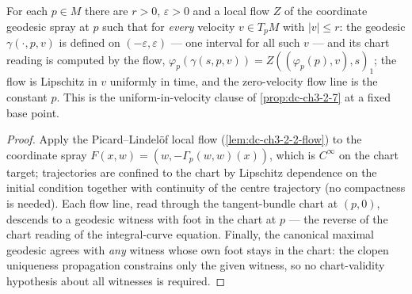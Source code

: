 \begin{lemma}
  \label{lem:dc-ch3-2-7-vuniform}


  For each $p \in M$ there are $r > 0$, $\varepsilon > 0$ and a local flow $Z$
  of the coordinate geodesic spray at $p$ such that for \emph{every} velocity
  $v \in T_pM$ with $|v| \le r$: the geodesic $\gamma(\cdot, p, v)$ is defined
  on $(-\varepsilon, \varepsilon)$ — one interval for all such $v$ — and its
  chart reading is computed by the flow,
  $\varphi_p(\gamma(s, p, v)) = Z((\varphi_p(p), v), s)_1$; the flow is
  Lipschitz in $v$ uniformly in time, and the zero-velocity flow line is the
  constant $p$. This is the uniform-in-velocity clause of
  \cref{prop:dc-ch3-2-7} at a fixed base point.
\end{lemma}
\begin{proof}
  \sketch

  Apply the Picard--Lindelöf local flow (\cref{lem:dc-ch3-2-2-flow}) to the
  coordinate spray $F(x, w) = (w, -\Gamma_p(w, w)(x))$, which is $C^\infty$ on
  the chart target; trajectories are confined to the chart by Lipschitz
  dependence on the initial condition together with continuity of the centre
  trajectory (no compactness is needed). Each flow line, read through the
  tangent-bundle chart at $(p, 0)$, descends to a geodesic witness with foot in
  the chart at $p$ — the reverse of the chart reading of the integral-curve
  equation. Finally, the canonical maximal geodesic agrees with \emph{any}
  witness whose own foot stays in the chart: the clopen uniqueness propagation
  constrains only the given witness, so no chart-validity hypothesis about all
  witnesses is required.
\end{proof}

